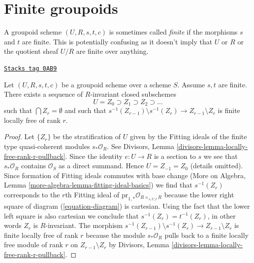 \section{Finite groupoids}
\label{more-groupoids-section-finite-groupoids}
A groupoid scheme $(U, R, s, t, c)$ is sometimes called {\it finite} if the
morphisms $s$ and $t$ are finite. This is potentially confusing as it doesn't
imply that $U$ or $R$ or the quotient sheaf $U/R$ are finite over anything.

\begin{lemma}
\label{more-groupoids-lemma-finite-stratify}
\href{https://stacks.math.columbia.edu/tag/0AB9}{\texttt{Stacks tag 0AB9}}

Let $(U, R, s, t, c)$ be a groupoid scheme over a scheme $S$. Assume $s, t$
are finite. There exists a sequence of $R$-invariant closed subschemes
$$
U = Z_0 \supset Z_1 \supset Z_2 \supset \ldots
$$
such that $\bigcap Z_r = \emptyset$ and such that
$s^{-1}(Z_{r - 1}) \setminus s^{-1}(Z_r) \to Z_{r - 1} \setminus Z_r$
is finite locally free of rank $r$.
\end{lemma}

\begin{proof}
Let $\{Z_r\}$ be the stratification of $U$ given by the Fitting ideals
of the finite type quasi-coherent modules $s_*\mathcal{O}_R$. See
Divisors, Lemma \ref{divisors-lemma-locally-free-rank-r-pullback}.
Since the identity $e : U \to R$ is a section to $s$ we see that
$s_*\mathcal{O}_R$ contains $\mathcal{O}_S$ as a direct summand.
Hence $U = Z_{-1} = Z_0$ (details omitted).
Since formation of Fitting ideals commutes with base change
(More on Algebra, Lemma \ref{more-algebra-lemma-fitting-ideal-basics})
we find that $s^{-1}(Z_r)$ corresponds to the $r$th Fitting ideal
of $\text{pr}_{1, *}\mathcal{O}_{R \times_{s, U, t} R}$ because
the lower right square of diagram (\ref{equation-diagram}) is cartesian.
Using the fact that the lower left square is also cartesian we conclude
that $s^{-1}(Z_r) = t^{-1}(Z_r)$, in other words $Z_r$ is $R$-invariant.
The morphism
$s^{-1}(Z_{r - 1}) \setminus s^{-1}(Z_r) \to Z_{r - 1} \setminus Z_r$
is finite locally free of rank $r$ because the module
$s_*\mathcal{O}_R$ pulls back to a finite locally free module of rank $r$
on $Z_{r - 1} \setminus Z_r$ by
Divisors, Lemma \ref{divisors-lemma-locally-free-rank-r-pullback}.
\end{proof}

